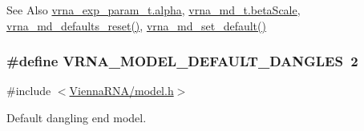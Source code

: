 \begin{DoxySeeAlso}{See Also}
\hyperlink{group__energy__parameters_a77145830b7bb01b36c3217b363310ef0}{vrna\-\_\-exp\-\_\-param\-\_\-t.\-alpha}, \hyperlink{group__model__details_a19524bf1d8d7ab590ed36edbbcaaba2c}{vrna\-\_\-md\-\_\-t.\-beta\-Scale}, \hyperlink{group__model__details_ga70834424cf804d149937de89f80ceb45}{vrna\-\_\-md\-\_\-defaults\-\_\-reset()}, \hyperlink{group__model__details_ga8ac6ff84936282436f822644bf841f66}{vrna\-\_\-md\-\_\-set\-\_\-default()} 
\end{DoxySeeAlso}
\hypertarget{group__model__details_ga2aa7bc2cae774b83a5c468f824c27a42}{
\subsubsection[{V\-R\-N\-A\-\_\-\-M\-O\-D\-E\-L\-\_\-\-D\-E\-F\-A\-U\-L\-T\-\_\-\-D\-A\-N\-G\-L\-E\-S}]{\setlength{\rightskip}{0pt plus 5cm}\#define V\-R\-N\-A\-\_\-\-M\-O\-D\-E\-L\-\_\-\-D\-E\-F\-A\-U\-L\-T\-\_\-\-D\-A\-N\-G\-L\-E\-S~2}}\label{group__model__details_ga2aa7bc2cae774b83a5c468f824c27a42}


{\ttfamily \#include $<$\hyperlink{model_8h}{Vienna\-R\-N\-A/model.\-h}$>$}



Default dangling end model. 

